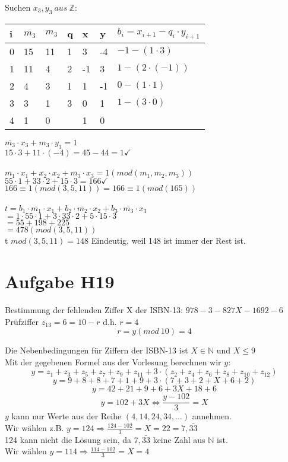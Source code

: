 \documentclass[11pt,a4paper]{article}
\begin{document}
\newpage
Suchen $x_3,y_3 ~aus~ \mathbb{Z}:$\\
\begin{center}
	\begin{tabular}{ | l | l | l | l | l | l | l|}
		\hline
		i&$\overline{m_3}$&$m_3$&q&x&y&$b_i=x_{i+1}-q_i \cdot y_{i+1} $ \\ \hline \hline
		0&15&11&1&3&-4&$-1-(1 \cdot 3 )$ \\ \hline
		1&11&4&2&-1&3&$1-(2 \cdot (-1))$ \\ \hline
		2&4&3&1&1&-1&$0-(1 \cdot 1)$ \\ \hline
		3&3&1&3&0&1&$1-(3\cdot 0)$ \\ \hline
		4&1&0&&1&0&\\ \hline
	\end{tabular}
\end{center}

$\overline{m_3} \cdot x_3 + m_3 \cdot y_3 = 1$\\
$15 \cdot 3 + 11 \cdot (-4) = 45 - 44 = 1 \checkmark$\\
\\
$\overline{m_1}\cdot x_1 + \overline{x_2} \cdot x_2 + \overline{m_3} \cdot x_3 = 1(mod(m_1,m_2,m_3))$\\
$55 \cdot 1 + 33 \cdot 2 + 15 \cdot 3 = 166 \checkmark$\\
$166\equiv 1 (mod(3,5,11)) = 166 \equiv 1(mod(165))$\\
\\
$t=b_1 \cdot \overline{m_1} \cdot x_1 + b_2 \cdot \overline{m_2} \cdot x_2 + b_3 \cdot \overline{m_3} \cdot x_3$\\
$= 1 \cdot 55 \cdot 1 + 3 \cdot 33 \cdot 2 + 5 \cdot 15 \cdot 3$\\
$= 55 + 198 + 225$\\
$= 478(mod(3,5,11))$\\
t $ mod(3,5,11) = 148 $
Eindeutig, weil 148 ist immer der Rest ist.

\section*{Aufgabe H19}
Bestimmung der fehlenden Ziffer X der ISBN-13: $978-3-827X-1692-6$\\
Prüfziffer $z_{13} = 6 = 10-r$ d.h. $r = 4$\\
\[r = y (mod~10) = 4\]

Die Nebenbedingungen für Ziffern der ISBN-13 ist $X \in \mathbb{N}$ und $X \leq 9$ \\
Mit der gegebenen Formel aus der Vorlesung berechnen wir $y$:\\
\[y = z_1+z_3+z_5+z_7+z_9+z_{11}+ 3 \cdot (z_2+z_4+z_6+z_8+z_{10}+z_{12})\]
\[y = 9+8+8+7+1+9 + 3 \cdot (7+3+2+X+6+2)\]
\[y= 42 + 21 +9 +6 + 3X + 18 + 6\]
\[y = 102 + 3X \Longleftrightarrow  \frac{y-102}{3} = X\]
$y$ kann nur Werte aus der Reihe $(4,14,24,34,\dots)$ annehmen.\\
Wir wählen z.B. $y=124 \Rightarrow \frac{124-102}{3} = X = 22= 7,\bar{33}$\\
124 kann nicht die Lösung sein, da $7,\bar{33}$ keine Zahl aus $\mathbb{N}$ ist.\\
Wir wählen $y=114 \Rightarrow \frac{114-102}{3} = X = 4$
\end{document}
